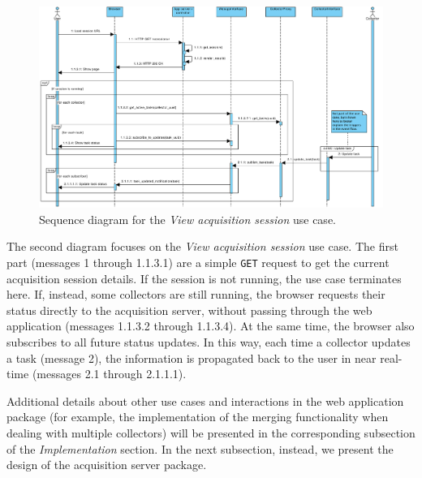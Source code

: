 \begin{figure}
  \centering
  \includegraphics[height=0.95\linewidth,angle=90,origin=c]{images/diagrams/seq-view-session}
  \caption{Sequence diagram for the \emph{View acquisition session} use case.}
  \label{fig:seq-view-session}
\end{figure}

The second diagram focuses on the \emph{View acquisition session} use case. The first part (messages 1 through 1.1.3.1) are a simple \texttt{GET} request to get the current acquisition session details. If the session is not running, the use case terminates here. If, instead, some collectors are still running, the browser requests their status directly to the acquisition server, without passing through the web application (messages 1.1.3.2 through 1.1.3.4). At the same time, the browser also subscribes to all future status updates. In this way, each time a collector updates a task (message 2), the information is propagated back to the user in near real-time (messages 2.1 through 2.1.1.1).

Additional details about other use cases and interactions in the web application package (for example, the implementation of the merging functionality when dealing with multiple collectors) will be presented in the corresponding subsection of the \emph{Implementation} section. In the next subsection, instead, we present the design of the acquisition server package.


